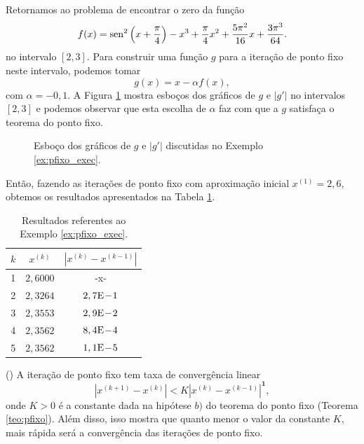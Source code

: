 \begin{ex}\label{ex:pfixo_exec}
  Retornamos ao problema de encontrar o zero da função
  \begin{equation}
    f(x) = \operatorname{sen}^2\left(x+\frac{\pi}{4}\right) - x^3 + \frac{\pi}{4}x^2 + \frac{5\pi^2}{16}x + \frac{3\pi^3}{64}.
  \end{equation}
  no intervalo $[2,3]$. Para construir uma função $g$ para a iteração de ponto fixo neste intervalo, podemos tomar
  \begin{equation}
    g(x) = x - \alpha f(x),
  \end{equation}
com $\alpha = -0,1$. A Figura \ref{fig:ex_pfixo_exec} mostra esboços dos gráficos de $g$ e $|g'|$ no intervalos $[2, 3]$ e podemos observar que esta escolha de $\alpha$ faz com que a $g$ satisfaça o teorema do ponto fixo.

\begin{figure}[h!]
  \centering
  \caption{Esboço dos gráficos de $g$ e $|g'|$ discutidas no Exemplo \ref{ex:pfixo_exec}.}
  \label{fig:ex_pfixo_exec}
\end{figure}

Então, fazendo as iterações de ponto fixo com aproximação inicial $x^{(1)}=2,6$, obtemos os resultados apresentados na Tabela \ref{tab:ex_pfixo_exec}.

\begin{table}[h!]
  \centering
  \caption{Resultados referentes ao Exemplo \ref{ex:pfixo_exec}.}
  \label{tab:ex_pfixo_exec}
  \begin{tabular}{r|cc}
    $k$ & $x^{(k)}$ & $|x^{(k)}-x^{(k-1)}|$ \\\hline
    1 & $2,6000$ & -x-\\
    2 & $2,3264$ & $2,7\mathrm{E}\!-\!1$ \\
    3 & $2,3553$ & $2,9\mathrm{E}\!-\!2$ \\
    4 & $2,3562$ & $8,4\mathrm{E}\!-\!4$ \\
    5 & $2,3562$ & $1,1\mathrm{E}\!-\!5$ \\\hline
  \end{tabular}
\end{table}

% 
\end{ex}

\begin{obs}()
  A iteração de ponto fixo tem taxa de convergência linear
  \begin{equation}
    |x^{(k+1)} - x^{(k)}| < K|x^{(k)} - x^{(k-1)}|^{\pmb{1}},
  \end{equation}
onde $K > 0$ é a constante dada na hipótese $b)$ do teorema do ponto fixo (Teorema \ref{teo:pfixo}). Além disso, isso mostra que quanto menor o valor da constante $K$, mais rápida será a convergência das iterações de ponto fixo.
\end{obs}

